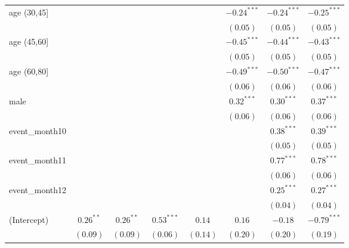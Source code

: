 \begin{table}
\begin{center}
\begin{tabular}{l c c c c c c c}
age (30,45]    &              &              &              &              & $-0.24^{***}$ & $-0.24^{***}$ & $-0.25^{***}$ \\
               &              &              &              &              & $(0.05)$      & $(0.05)$      & $(0.05)$      \\
age (45,60]    &              &              &              &              & $-0.45^{***}$ & $-0.44^{***}$ & $-0.43^{***}$ \\
               &              &              &              &              & $(0.05)$      & $(0.05)$      & $(0.05)$      \\
age (60,80]    &              &              &              &              & $-0.49^{***}$ & $-0.50^{***}$ & $-0.47^{***}$ \\
               &              &              &              &              & $(0.06)$      & $(0.06)$      & $(0.06)$      \\
male           &              &              &              &              & $0.32^{***}$  & $0.30^{***}$  & $0.37^{***}$  \\
               &              &              &              &              & $(0.06)$      & $(0.06)$      & $(0.06)$      \\
event\_month10 &              &              &              &              &               & $0.38^{***}$  & $0.39^{***}$  \\
               &              &              &              &              &               & $(0.05)$      & $(0.05)$      \\
event\_month11 &              &              &              &              &               & $0.77^{***}$  & $0.78^{***}$  \\
               &              &              &              &              &               & $(0.06)$      & $(0.06)$      \\
event\_month12 &              &              &              &              &               & $0.25^{***}$  & $0.27^{***}$  \\
               &              &              &              &              &               & $(0.04)$      & $(0.04)$      \\
(Intercept)    & $0.26^{**}$  & $0.26^{**}$  & $0.53^{***}$ & $0.14$       & $0.16$        & $-0.18$       & $-0.79^{***}$ \\
               & $(0.09)$     & $(0.09)$     & $(0.06)$     & $(0.14)$     & $(0.20)$      & $(0.20)$      & $(0.19)$      \\

\end{tabular}
\end{center}
\end{table}
